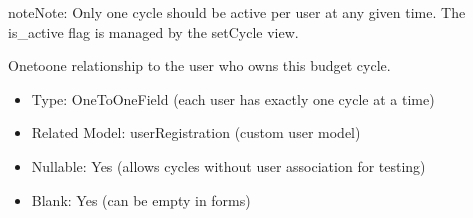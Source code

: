 \documentclass[letterpaper,10pt,english]{sphinxmanual}
\begin{document}
\begin{fulllineitems}
\begin{sphinxVerbatim}[commandchars=\\\{\}]
  
    
      
      
    
    
\end{sphinxVerbatim}

\begin{sphinxadmonition}{note}{Note:}
\sphinxAtStartPar
Only one cycle should be active per user at any given time.
The is\_active flag is managed by the setCycle view.
\end{sphinxadmonition}

\begin{fulllineitems}
\label{\detokenize{expensesApp:id5}}
\pysigstartsignatures
\pysigline
{}
\pysigstopsignatures
\sphinxAtStartPar
One\sphinxhyphen{}to\sphinxhyphen{}one relationship to the user who owns this budget cycle.
\begin{description}
\begin{itemize}
\item {} 
\sphinxAtStartPar
Type: OneToOneField (each user has exactly one cycle at a time)

\item {} 
\sphinxAtStartPar
Related Model: userRegistration (custom user model)

\item {} 
\sphinxAtStartPar
Nullable: Yes (allows cycles without user association for testing)

\item {} 
\sphinxAtStartPar
Blank: Yes (can be empty in forms)


\end{itemize}
\end{description}
\end{fulllineitems}
\end{fulllineitems}
\end{document}
